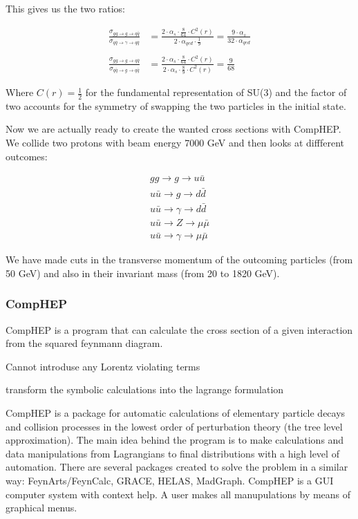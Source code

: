 This gives us the two ratios:

\begin{align}
	\frac{\sigma_{gg \rightarrow g \rightarrow q \bar q}}{\sigma_{q \bar q \rightarrow \gamma \rightarrow q \bar q}} &=\frac{2 \cdot \alpha_{s} \cdot \frac{8}{64} \cdot C^{2}(r)}{2 \cdot \alpha_{qed} \cdot \frac{1}{9}}=\frac{9 \cdot  \alpha_{s} }{32 \cdot  \alpha_{qed} }\\ \nonumber \\
	\frac{\sigma_{gg \rightarrow g \rightarrow q \bar q}}{\sigma_{q \bar q \rightarrow g \rightarrow q \bar q}} &=\frac{2 \cdot \alpha_{s} \cdot \frac{8}{64} \cdot C^{2}(r)}{2 \cdot \alpha_{s} \cdot \frac{8}{9} \cdot C^{2}(r)}=\frac{9}{68}
\end{align}

Where $C(r) = \frac{1}{2}$ for the fundamental representation of SU(3) and the factor of two accounts for the symmetry of swapping the two particles in the initial state.

Now we are actually ready to create the wanted cross sections with CompHEP. We collide two protons with beam energy 7000 GeV and then looks at diffferent outcomes:

\begin{align}
gg \rightarrow g \rightarrow u \bar u \nonumber \\ \nonumber
u \bar u \rightarrow g \rightarrow d \bar d \\ \nonumber
u \bar u \rightarrow \gamma \rightarrow d \bar d \\ \nonumber
u \bar u \rightarrow Z \rightarrow \mu \bar \mu \\ \nonumber
u \bar u \rightarrow \gamma \rightarrow \mu \bar \mu 
\end{align}

We have made cuts in the transverse momentum of the outcoming particles (from 50 GeV) and also in their invariant mass (from 20 to 1820 GeV). 


\subsubsection{CompHEP}
CompHEP is a program that can calculate the cross section of a given interaction from the squared feynmann diagram.

Cannot introduse any Lorentz violating terms

transform the symbolic calculations into the lagrange formulation


 CompHEP is a package for automatic calculations of elementary particle decays and collision processes in the lowest order of perturbation theory (the tree level approximation). The main idea behind the program is to make calculations and data manipulations from Lagrangians to final distributions with a high level of automation. There are several packages created to solve the problem in a similar way: FeynArts/FeynCalc, GRACE, HELAS, MadGraph. CompHEP is a GUI computer system with context help. A user makes all manupulations by means of graphical menus.

